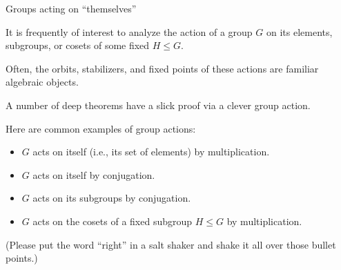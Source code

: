 \documentclass[8pt, handout]{beamer}
\newcommand{\Pause}{\pause}      %
\begin{document}
\begin{frame}{Groups acting on ``themselves''} %
  
  It is frequently of interest to analyze the action of a group $G$ on
  its elements, subgroups, or cosets of some fixed $H\leq G$.
  
  \bigskip
  
  Often, the orbits, stabilizers, and fixed points of these actions
  are familiar algebraic objects.
  
  \bigskip
  
  A number of deep theorems have a slick proof via a clever group
  action.
  
  \bigskip
  
  Here are common examples of group actions: 
  
  \begin{itemize}
  \item $G$ acts on itself (i.e., its set of elements) by multiplication. 
  \item $G$ acts on itself by conjugation. 
  \item $G$ acts on its subgroups by conjugation. 
  \item $G$ acts on the cosets of a fixed subgroup $H\leq G$ by
    multiplication. 
  \end{itemize}

  \medskip

  (Please put the word ``right'' in a salt shaker and shake it all over those bullet points.)
  
\end{frame}

\end{document}
